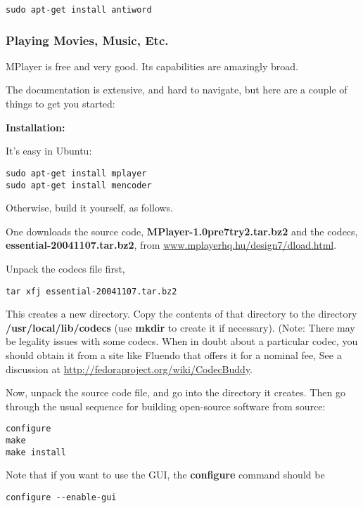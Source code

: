 \documentclass[11pt]{article}
\begin{document}
\begin{Verbatim}[fontsize=\relsize{-2}]
sudo apt-get install antiword 
\end{Verbatim}

\subsubsection{Playing Movies, Music, Etc.}
\label{mplayer}

MPlayer is free and very good.  Its capabilities are amazingly broad.

The documentation is extensive, and hard to navigate, but here are a
couple of things to get you started:

{\bf Installation:}

It's easy in Ubuntu:

\begin{Verbatim}[fontsize=\relsize{-2}]
sudo apt-get install mplayer 
sudo apt-get install mencoder 
\end{Verbatim}

Otherwise, build it yourself, as follows.

One downloads the source code, {\bf MPlayer-1.0pre7try2.tar.bz2} and the
codecs, {\bf essential-20041107.tar.bz2}, from
\url{www.mplayerhq.hu/design7/dload.html}.  

Unpack the codecs file first, 

\begin{Verbatim}[fontsize=\relsize{-2}]
tar xfj essential-20041107.tar.bz2
\end{Verbatim}

This creates a new directory.  Copy the contents of that directory to
the directory {\bf /usr/local/lib/codecs} (use {\bf mkdir} to create it
if necessary).  (Note:  There may be legality issues with some codecs.
When in doubt about a particular codec, you should obtain it from a site
like Fluendo that offers it for a nominal fee,  See a discussion at
\url{http://fedoraproject.org/wiki/CodecBuddy}.

Now, unpack the source code file, and go into the directory it creates.
Then go through the usual sequence for building open-source software
from source:

\begin{verbatim}
configure
make
make install
\end{verbatim}

Note that if you want to use the GUI, the {\bf configure} command should
be

\begin{Verbatim}[fontsize=\relsize{-2}]
configure --enable-gui
\end{Verbatim}
\end{document}
